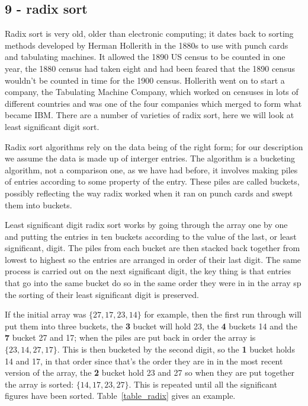 \documentclass[11pt,a4paper]{scrartcl}
\begin{document}
\subsection*{9 - radix sort}

Radix sort is very old, older than electronic computing; it dates back
to sorting methods developed by Herman Hollerith in the 1880s to use
with punch cards and tabulating machines. It allowed the 1890 US
census to be counted in one year, the 1880 census had taken eight and
had been feared that the 1890 census wouldn't be counted in time for
the 1900 census. Hollerith went on to start a company, the Tabulating
Machine Company, which worked on censuses in lots of different
countries and was one of the four companies which merged to form what
became IBM. There are a number of varieties of radix sort, here we
will look at least significant digit sort.

Radix sort algorithms rely on the data being of the right form; for
our description we assume the data is made up of interger entries. The
algorithm is a bucketing algorithm, not a comparison one, as we have
had before, it involves making piles of entries according to some
property of the entry. These piles are called buckets, possibly
reflecting the way radix worked when it ran on punch cards and swept
them into buckets.

Least significant digit radix sort works by going through the array
one by one and putting the entries in ten buckets according to the
value of the last, or least significant, digit. The piles from each
bucket are then stacked back together from lowest to highest so the
entries are arranged in order of their last digit. The same process is
carried out on the next significant digit, the key thing is that
entries that go into the same bucket do so in the same order they were
in in the array sp the sorting of their least significant digit is
preserved. 

If the initial array was $\{27,17,23,14\}$ for example, then the first
run through will put them into three buckets, the {\bf 3} bucket will
hold 23, the {\bf 4} buckets 14 and the {\bf 7} bucket 27 and 17; when
the piles are put back in order the array is $\{23,14,27,17\}$. This
is then bucketed by the second digit, so the {\bf 1} bucket holds 14
and 17, in that order since that's the order they are in in the most
recent version of the array, the {\bf 2} bucket hold 23 and 27 so when
they are put together the array is sorted: $\{14,17,23,27\}$. This is
repeated until all the significant figures have been
sorted. Table~\ref{table_radix} gives an example.
\end{document}
